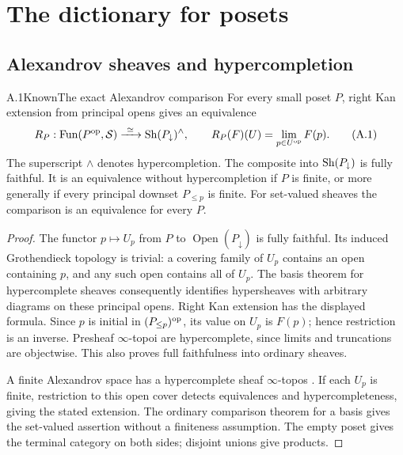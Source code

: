 \section{The dictionary for posets}

\subsection{Alexandrov sheaves and hypercompletion}

\begin{statement}{A.1}{Known}{The exact Alexandrov comparison}
For every small poset $P$, right Kan extension from principal opens gives
an equivalence
\[
 R_P:\operatorname{Fun}(P^{\mathrm{op}},\mathcal S)\xrightarrow{\ \simeq\ }
 \operatorname{Sh}(P_{\downarrow})^{\wedge},\qquad
 R_P(F)(U)=\operatorname*{lim}_{p\in U^{\mathrm{op}}}F(p).\tag{A.1}
\]
The superscript $\wedge$ denotes hypercompletion. The composite into
$\operatorname{Sh}(P_{\downarrow})$ is fully faithful. It is an equivalence without
hypercompletion if $P$ is finite, or more generally if every principal
downset $P_{\leq p}$ is finite. For set-valued sheaves the comparison is an
equivalence for every $P$.
\end{statement}
\begin{proof}
The functor $p\mapsto U_p$ from $P$ to $\operatorname{Open}(P_{\downarrow})$
is fully faithful. Its induced Grothendieck topology is trivial: a covering
family of $U_p$ contains an open containing $p$, and any such open contains
all of $U_p$. The basis theorem for hypercomplete sheaves
\citep[Proposition 3.12.11 and Example 3.12.15]{BGH2020} consequently
identifies hypersheaves with arbitrary diagrams on these principal opens.
Right Kan extension has the displayed formula. Since $p$ is initial in
$(P_{\leq p})^{\mathrm{op}}$, its value on $U_p$ is $F(p)$; hence restriction is
an inverse. Presheaf $\infty$-topoi are hypercomplete, since limits and
truncations are objectwise. This also proves full faithfulness into
ordinary sheaves.

A finite Alexandrov space has a hypercomplete sheaf $\infty$-topos
\citep[Example 3.12.15]{BGH2020}. If each $U_p$ is finite, restriction to
this open cover detects equivalences and hypercompleteness, giving the
stated extension. The ordinary comparison theorem for a basis gives the
set-valued assertion without a finiteness assumption. The empty poset
gives the terminal category on both sides; disjoint unions give products.
\end{proof}


